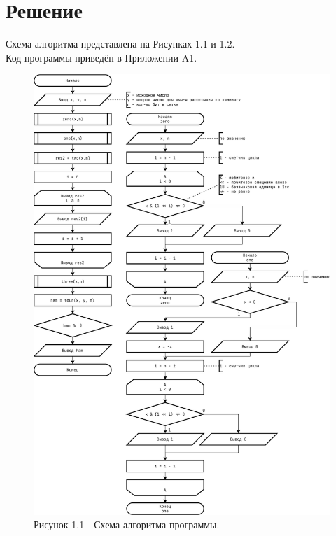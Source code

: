 \documentclass[oneside,a4paper,14pt]{extarticle}
\begin{document}
\section*{Решение}
\noindent Схема алгоритма представлена на Рисунках 1.1 и 1.2. \\
\noindent Код программы приведён в Приложении A1.\\
\begin{figure}[h!]
    \centering
    \includegraphics[height=0.75\textheight]{pics/flowchart_p1.png}
    \caption*{Рисунок 1.1 - Схема алгоритма программы.}
\end{figure}
\end{document}
